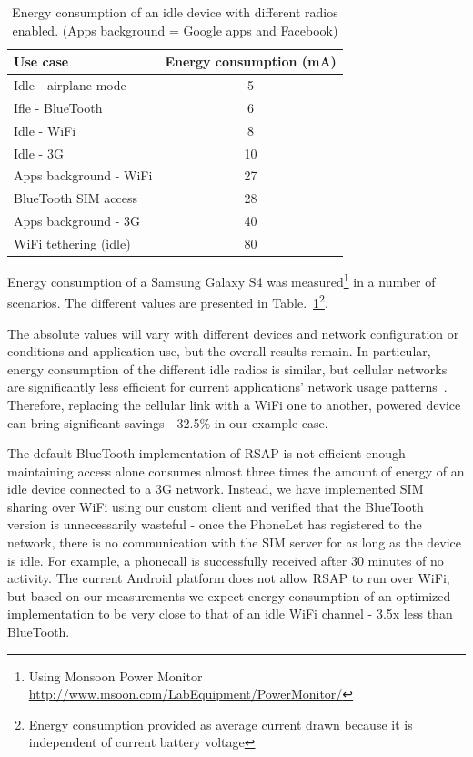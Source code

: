 \documentclass{sig-alternate-10pt}
\begin{document}
\begin{table}[t]
{
\small
\begin{tabular}{| l | c |}
\hline
  \textbf{Use case}         & \textbf{Energy consumption (mA)}  \\ \hline
  Idle - airplane mode      & 5     \\ \hline
  Ifle - BlueTooth          & 6     \\ \hline
  Idle - WiFi               & 8     \\ \hline
  Idle - 3G                 & 10    \\ \hline
  Apps background - WiFi    & 27    \\ \hline
  BlueTooth SIM access      & 28    \\ \hline
  Apps background - 3G      & 40    \\ \hline
  WiFi tethering (idle)     & 80    \\ \hline
\end{tabular}
}
\caption{Energy consumption of an idle device with different radios enabled. (Apps background = Google apps and Facebook)}
\label{tab:energy}
\end{table}

Energy consumption of a Samsung Galaxy S4 was measured\footnote{Using Monsoon Power Monitor \url{http://www.msoon.com/LabEquipment/PowerMonitor/}} in a number of scenarios. The different values are presented in Table.~\ref{tab:energy}\footnote{Energy consumption provided as average current drawn because it is independent of current battery voltage}. 

The absolute values will vary with different devices and network configuration or conditions and application use, but the overall results remain. In particular, energy consumption of the different idle radios is similar, but cellular networks are significantly less efficient for current applications' network usage patterns~\cite{Aucinas:2013uk}. Therefore, replacing the cellular link with a WiFi one to another, powered device can bring significant savings - 32.5\% in our example case.

The default BlueTooth implementation of RSAP is not efficient enough - maintaining access alone consumes almost three times the amount of energy of an idle device connected to a 3G network. Instead, we have implemented SIM sharing over WiFi using our custom client and verified that the BlueTooth version is unnecessarily wasteful - once the PhoneLet has registered to the network, there is no communication with the SIM server for as long as the device is idle. For example, a phonecall is successfully received after 30 minutes of no activity. The current Android platform does not allow RSAP to run over WiFi, but based on our measurements we expect energy consumption of an optimized implementation to be very close to that of an idle WiFi channel - 3.5x less than BlueTooth.
\end{document}

